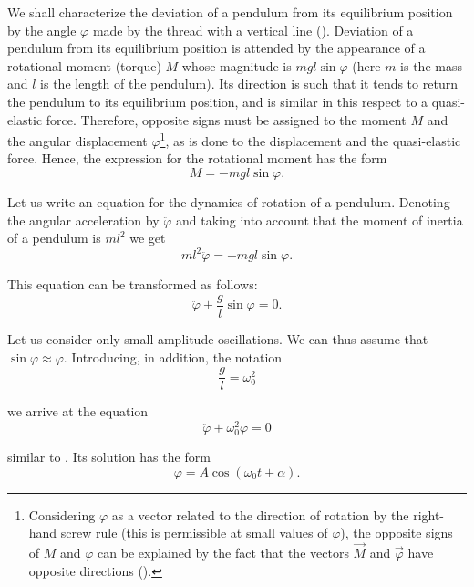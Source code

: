 We shall characterize the deviation of a pendulum from its equilibrium position by the angle $\varphi$ made by the thread with a vertical line (). Deviation of a pendulum from its equilibrium position is attended by the appearance of a rotational moment (torque) $M$ whose magnitude is $mgl\sin\varphi$ (here $m$ is the mass and $l$ is the length of the pendulum). Its direction is such that it tends to return the pendulum to its equilibrium position, and is similar in this respect to a quasi-elastic force. Therefore, opposite signs must be assigned to the moment $M$ and the angular displacement $\varphi$\footnote{Considering $\varphi$ as a vector related to the direction of rotation by the right-hand screw rule (this is permissible at small values of $\varphi$), the opposite signs of	$M$ and $\varphi$ can be explained by the fact that the vectors $\vec{M}$ and $\vec{\varphi}$ have opposite	directions ().}, as is done to the displacement and the quasi-elastic force. Hence, the expression for the rotational moment has the form
\begin{equation}\label{eq:7_71}
	M = -mgl\sin\varphi.
\end{equation}

Let us write an equation for the dynamics of rotation of a pendulum. Denoting the angular acceleration by $\ddot{\varphi}$ and taking into account that the moment of inertia of a pendulum is $ml^2$ we get
\begin{equation*}
	ml^2\ddot{\varphi} = -mgl\sin\varphi.
\end{equation*}

\noindent
This equation can be transformed as follows:
\begin{equation}\label{eq:7_72}
	\ddot{\varphi} + \frac{g}{l}\sin\varphi = 0.
\end{equation}

Let us consider only small-amplitude oscillations. We can thus assume that $\sin\varphi\approx\varphi$. Introducing, in addition, the notation
\begin{equation}\label{eq:7_73}
	\frac{g}{l} = \omega_0^2
\end{equation}

\noindent
we arrive at the equation
\begin{equation}\label{eq:7_74}
	\ddot{\varphi} + \omega_0^2\varphi = 0
\end{equation}

\noindent
similar to . Its solution has the form
\begin{equation}\label{eq:7_75}
	\varphi = A\cos(\omega_0 t + \alpha).
\end{equation}


